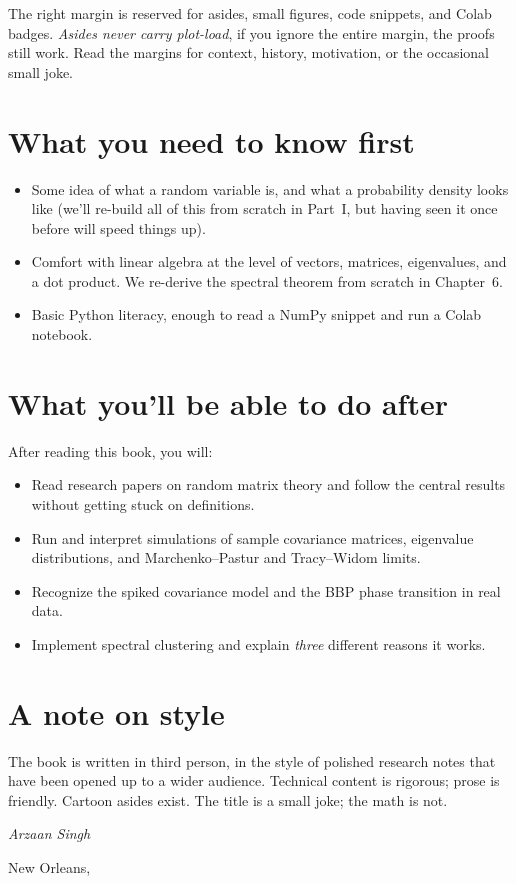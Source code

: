 The right margin is reserved for asides, small figures, code snippets, and Colab badges. \emph{Asides never carry plot-load}, if you ignore the entire margin, the proofs still work. Read the margins for context, history, motivation, or the occasional small joke.


\section*{What you need to know first}

\begin{itemize}
  \item Some idea of what a random variable is, and what a probability density looks like (we'll re-build all of this from scratch in Part~I, but having seen it once before will speed things up).
  \item Comfort with linear algebra at the level of vectors, matrices, eigenvalues, and a dot product. We re-derive the spectral theorem from scratch in Chapter~6.
  \item Basic Python literacy, enough to read a NumPy snippet and run a Colab notebook.
\end{itemize}

\section*{What you'll be able to do after}

After reading this book, you will:

\begin{itemize}
  \item Read research papers on random matrix theory and follow the central results without getting stuck on definitions.
  \item Run and interpret simulations of sample covariance matrices, eigenvalue distributions, and Marchenko--Pastur and Tracy--Widom limits.
  \item Recognize the spiked covariance model and the BBP phase transition in real data.
  \item Implement spectral clustering and explain \emph{three} different reasons it works.
\end{itemize}

\section*{A note on style}

The book is written in third person, in the style of polished research notes that have been opened up to a wider audience. Technical content is rigorous; prose is friendly. Cartoon asides exist. The title is a small joke; the math is not.

\bigskip
\noindent\hfill\textit{Arzaan Singh}\par
\noindent\hfill New Orleans, \DTMtoday
